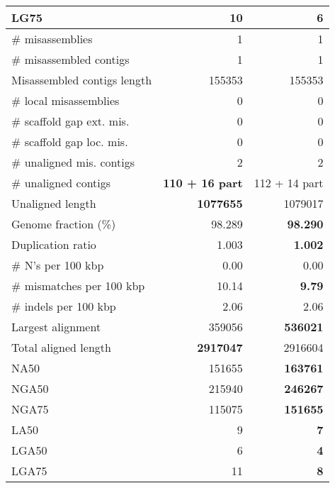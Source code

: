 \documentclass[12pt,a4paper]{article}
\begin{document}
\begin{table}[ht]
\begin{center}
\begin{tabular}{|l*{2}{|r}|}
LG75 & 10 & {\bf 6} \\ \hline
\# misassemblies & 1 & 1 \\ \hline
\# misassembled contigs & 1 & 1 \\ \hline
Misassembled contigs length & 155353 & 155353 \\ \hline
\# local misassemblies & 0 & 0 \\ \hline
\# scaffold gap ext. mis. & 0 & 0 \\ \hline
\# scaffold gap loc. mis. & 0 & 0 \\ \hline
\# unaligned mis. contigs & 2 & 2 \\ \hline
\# unaligned contigs & {\bf 110 + 16 part} & 112 + 14 part \\ \hline
Unaligned length & {\bf 1077655} & 1079017 \\ \hline
Genome fraction (\%) & 98.289 & {\bf 98.290} \\ \hline
Duplication ratio & 1.003 & {\bf 1.002} \\ \hline
\# N's per 100 kbp & 0.00 & 0.00 \\ \hline
\# mismatches per 100 kbp & 10.14 & {\bf 9.79} \\ \hline
\# indels per 100 kbp & 2.06 & 2.06 \\ \hline
Largest alignment & 359056 & {\bf 536021} \\ \hline
Total aligned length & {\bf 2917047} & 2916604 \\ \hline
NA50 & 151655 & {\bf 163761} \\ \hline
NGA50 & 215940 & {\bf 246267} \\ \hline
NGA75 & 115075 & {\bf 151655} \\ \hline
LA50 & 9 & {\bf 7} \\ \hline
LGA50 & 6 & {\bf 4} \\ \hline
LGA75 & 11 & {\bf 8} \\ \hline
\end{tabular}
\end{center}
\end{table}
\end{document}
